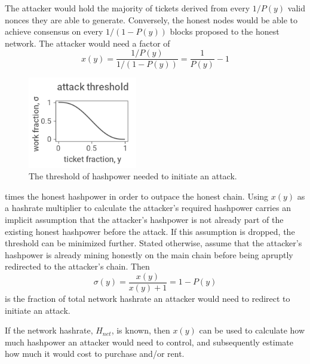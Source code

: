 \documentclass[a4paper,12pt]{article}
\begin{document}
The attacker would hold the majority of tickets derived from every $ 1 / P(y) $ valid nonces they are able to generate. Conversely, the honest nodes would be able to achieve consensus on every $ 1 / (1 - P(y)) $ blocks proposed to the honest network. The attacker would need a factor of 
%
\begin{equation}
x(y) = \frac{ 1 / P(y) }{ 1 / ( 1 - P(y) ) } = \frac{ 1 }{ P(y) } - 1
\end{equation}
%
\begin{figure}
  \vspace{-10pt}
  \begin{center}
    	\includegraphics[width=1.87in]{sigma}
	\vspace{-10pt}
	\begin{minipage}[t]{0.35\textwidth}
	\caption{The threshold of hashpower needed to initiate an attack. \label{sigmafig}}	
	\end{minipage}
	\vspace{10pt}
  \end{center}
\end{figure}
%
times the honest hashpower in order to outpace the honest chain. Using $ x(y) $ as a hashrate multiplier to calculate the attacker's required hashpower carries an implicit assumption that the attacker's hashpower is not already part of the existing honest hashpower before the attack. If this assumption is dropped, the threshold can be minimized further. Stated otherwise, assume that the attacker's hashpower is already mining honestly on the main chain before being apruptly redirected to the attacker's chain. Then
%
\begin{equation}
\label{sigmaeq}
\sigma(y) = \frac{ x(y) }{ x(y) + 1 } = 1 - P(y)
\end{equation}
%
is the fraction of total network hashrate an attacker would need to redirect to initiate an attack. 

If the network hashrate, $ H_{net} $, is known, then $ x(y) $ can be used to calculate how much hashpower an attacker would need to control, and subsequently estimate how much it would cost to purchase and/or rent. 
\end{document}

